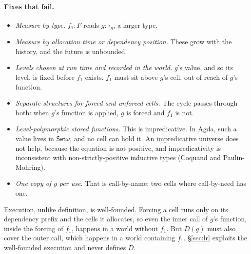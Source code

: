 \documentclass[11pt]{article}
\begin{document}
\paragraph{Fixes that fail.}
\begin{itemize}
  \item \emph{Measure by type.} $f_1 : F$ reads $g : \tau_g$, a larger type.
  \item \emph{Measure by allocation time or dependency position.} These grow
    with the history, and the future is unbounded.
  \item \emph{Levels chosen at run time and recorded in the world.} $g$'s
    value, and so its level, is fixed before $f_1$ exists. $f_1$ must sit
    above $g$'s cell, out of reach of $g$'s function.
  \item \emph{Separate structures for forced and unforced cells.} The cycle
    passes through both: when $g$'s function is applied, $g$ is forced and
    $f_1$ is not.
  \item \emph{Level-polymorphic stored functions.} This is impredicative. In
    Agda, such a value lives in $\mathsf{Set}\omega$, and no cell can hold
    it. An impredicative universe does not help, because the equation is not
    positive, and impredicativity is inconsistent with
    non-strictly-positive inductive types (Coquand and Paulin-Mohring).
  \item \emph{One copy of $g$ per use.} That is call-by-name: two cells
    where call-by-need has one.
\end{itemize}
Execution, unlike definition, is well-founded. Forcing a cell runs only on
its dependency prefix and the cells it allocates, so even the inner call of
$g$'s function, inside the forcing of $f_1$, happens in a world without
$f_1$. But $D(g)$ must also cover the outer call, which happens in a world
containing $f_1$. \S\ref{sec:lr} exploits the well-founded execution and
never defines $D$.
\end{document}
